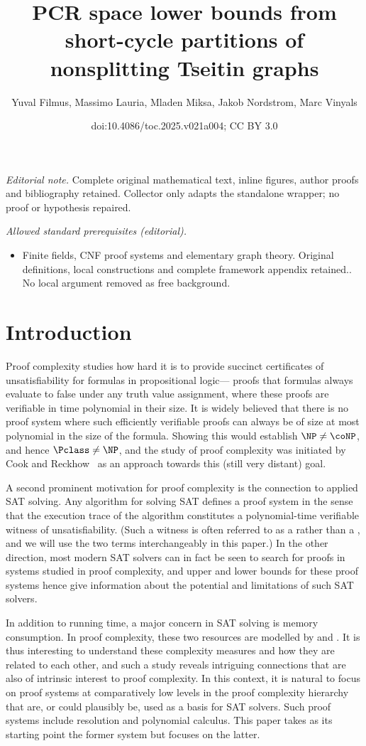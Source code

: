 \documentclass[11pt]{article}
\title{PCR space lower bounds from short-cycle partitions of nonsplitting Tseitin graphs}
\author{Yuval Filmus, Massimo Lauria, Mladen Miksa, Jakob Nordstrom, Marc Vinyals}
\date{doi:10.4086/toc.2025.v021a004; CC BY 3.0}
\numberwithin{equation}{section}
\theoremstyle{definition}
\theoremstyle{plain}
\begin{document}
\maketitle
\noindent\textit{Editorial note.} Complete original mathematical text, inline figures, author proofs and bibliography retained. Collector only adapts the standalone wrapper; no proof or hypothesis repaired.\par\medskip
\noindent\textit{Allowed standard prerequisites (editorial).}\begin{itemize}
\item Finite fields, CNF proof systems and elementary graph theory. Original definitions, local constructions and complete framework appendix retained.. No local argument removed as free background.
\end{itemize}\medskip
\section{Introduction}
\label{sec:introduction}

Proof complexity studies how hard it is to provide succinct
certificates of unsatisfiability for formulas in propositional logic---\ieComma
proofs that formulas always evaluate to false under any truth value
assignment, where these proofs are verifiable in time polynomial in
their size.
%
It is widely believed that there is no proof system where such
efficiently verifiable proofs can always be  of size at most
polynomial in the size of the formula.
%
Showing this would establish $\NP \neq \coNP$, and hence
$\Pclass \neq \NP$, and the study of proof complexity was initiated by
Cook and Reckhow~\cite{CR79Relative} as an approach towards this
(still very distant) goal.

A second prominent motivation for proof complexity is the connection
to applied SAT solving. 
%
Any algorithm for solving SAT defines a proof system in the
sense that the execution trace of the algorithm constitutes a
polynomial-time verifiable witness of unsatisfiability. %
(Such a witness
is often referred to as a  rather than a
, and we will use the two terms interchangeably in
this paper.) %
In the other direction, most modern SAT solvers can in
fact be seen to search for proofs in systems studied in proof
complexity, and upper and lower bounds for these proof systems hence
give information about the potential and limitations of 
such SAT solvers.

In addition to running time, a major concern in SAT solving is memory
consumption. 
In proof complexity, these two resources are modelled by
and
.
%
It is thus interesting to understand these
complexity measures and how they are related to each other, and such a
study reveals intriguing connections that are also of intrinsic
interest to proof complexity. In this context, it is natural to focus
on proof systems at comparatively low levels in the proof complexity
hierarchy that are, or could plausibly be, used as a basis for SAT
solvers. Such proof systems include resolution and polynomial
calculus. This paper takes as its starting point the former system but
focuses on the latter.
\end{document}
